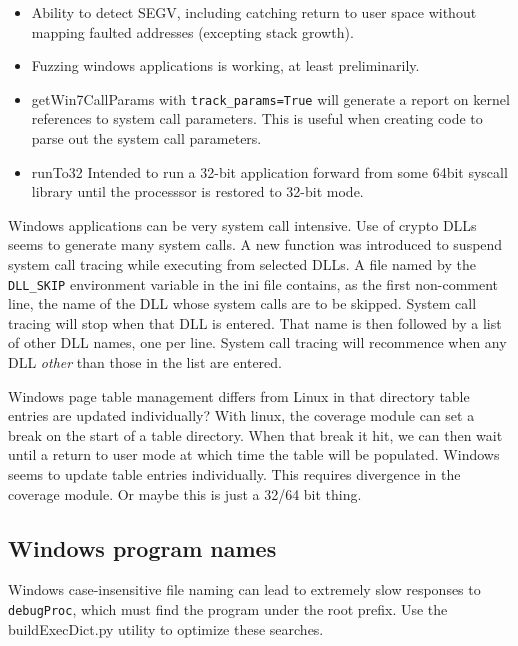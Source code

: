 \documentclass[titlepage]{article}
\begin{document}
\begin{appendices}
\begin{itemize}
\item Ability to detect SEGV, including catching return to user space without mapping faulted addresses (excepting stack growth).

\item Fuzzing windows applications is working, at least preliminarily.

\item getWin7CallParams with {\tt track\_params=True} will generate a report on kernel references to system call parameters.  This is useful when creating code to parse out
the system call parameters.

\item runTo32 Intended to run a 32-bit application forward from some 64bit syscall library until the processsor is restored to 32-bit mode.
\end{itemize}
\label{dll_skip}
Windows applications can be very system call intensive.  Use of crypto DLLs seems to generate many system calls.  A new function was introduced to suspend 
system call tracing while executing from selected DLLs. A file named by the {\tt DLL\_SKIP} environment variable in the ini file contains, as the first non-comment line, the name of the DLL whose system calls are to be 
skipped. System call tracing will stop when that DLL is entered.  That name is then followed by a list of other DLL names, one per line.  
System call tracing will recommence when any DLL \textit{other} than those in the list are entered.

Windows page table management differs from Linux in that directory table entries are updated individually? With linux, the coverage module can
set a break on the start of a table directory.  When that break it hit, we can then wait until a return to user mode at which time the
table will be populated.  Windows seems to update table entries individually.  This requires divergence in the coverage module.  Or maybe this is just a 32/64 bit thing.

\subsection{Windows program names}
Windows case-insensitive file naming can lead to extremely slow responses to {\tt debugProc}, which must find the program under the root prefix.  Use the
buildExecDict.py utility to optimize these searches.


\end{appendices}
\end{document}
